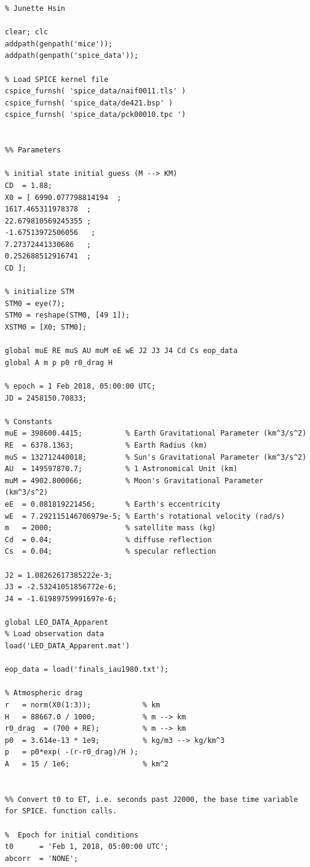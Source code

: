 \documentclass[conf]{new-aiaa}
\begin{document}
\begin{lstlisting}[basicstyle=\footnotesize]
% HW 5 
% Junette Hsin 

clear; clc 
addpath(genpath('mice')); 
addpath(genpath('spice_data')); 

% Load SPICE kernel file 
cspice_furnsh( 'spice_data/naif0011.tls' )
cspice_furnsh( 'spice_data/de421.bsp' )       
cspice_furnsh( 'spice_data/pck00010.tpc ') 


%% Parameters 

% initial state initial guess (M --> KM)
CD  = 1.88; 
X0 = [ 6990.077798814194  ; 
1617.465311978378  ; 
22.679810569245355 ; 
-1.67513972506056   ; 
7.27372441330686   ; 
0.252688512916741  ; 
CD ];

% initialize STM 
STM0 = eye(7); 
STM0 = reshape(STM0, [49 1]); 
XSTM0 = [X0; STM0];  

global muE RE muS AU muM eE wE J2 J3 J4 Cd Cs eop_data 
global A m p p0 r0_drag H 

% epoch = 1 Feb 2018, 05:00:00 UTC; 
JD = 2458150.70833; 

% Constants 
muE = 398600.4415;          % Earth Gravitational Parameter (km^3/s^2) 
RE  = 6378.1363;            % Earth Radius (km)
muS = 132712440018;         % Sun's Gravitational Parameter (km^3/s^2)
AU  = 149597870.7;          % 1 Astronomical Unit (km)
muM = 4902.800066;          % Moon's Gravitational Parameter (km^3/s^2)
eE  = 0.081819221456;       % Earth's eccentricity 
wE  = 7.292115146706979e-5; % Earth's rotational velocity (rad/s)
m   = 2000;                 % satellite mass (kg) 
Cd  = 0.04;                 % diffuse reflection 
Cs  = 0.04;                 % specular reflection 

J2 = 1.08262617385222e-3; 
J3 = -2.53241051856772e-6;
J4 = -1.61989759991697e-6; 

global LEO_DATA_Apparent 
% Load observation data 
load('LEO_DATA_Apparent.mat') 

eop_data = load('finals_iau1980.txt'); 

% Atmospheric drag 
r   = norm(X0(1:3));            % km 
H   = 88667.0 / 1000;           % m --> km 
r0_drag  = (700 + RE);          % m --> km 
p0  = 3.614e-13 * 1e9;          % kg/m3 --> kg/km^3 
p   = p0*exp( -(r-r0_drag)/H ); 
A   = 15 / 1e6;                 % km^2 


%% Convert t0 to ET, i.e. seconds past J2000, the base time variable for SPICE. function calls.

%  Epoch for initial conditions 
t0      = 'Feb 1, 2018, 05:00:00 UTC'; 
abcorr  = 'NONE';


\end{lstlisting}
\end{document}
